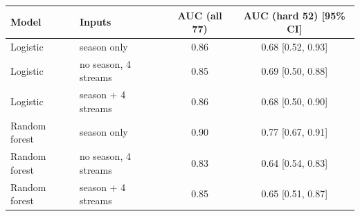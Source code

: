 \begin{tabular}{@{}llcc@{}}
\toprule
Model & Inputs & AUC (all 77) & AUC (hard 52) [95\% CI] \\
\midrule
Logistic & season only & 0.86 & 0.68 [0.52, 0.93] \\
Logistic & no season, 4 streams & 0.85 & 0.69 [0.50, 0.88] \\
Logistic & season + 4 streams & 0.86 & 0.68 [0.50, 0.90] \\
\midrule
Random forest & season only & 0.90 & 0.77 [0.67, 0.91] \\
Random forest & no season, 4 streams & 0.83 & 0.64 [0.54, 0.83] \\
Random forest & season + 4 streams & 0.85 & 0.65 [0.51, 0.87] \\
\bottomrule
\end{tabular}
